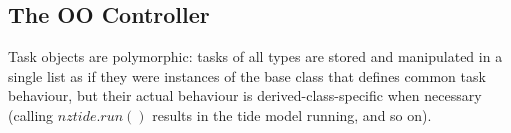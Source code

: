 \documentclass[12pt]{amsart}
\begin{document}
\subsection{The OO Controller}

Task objects are polymorphic: tasks of all types are stored and
manipulated in a single list as if they were instances of the base class
that defines common task behaviour, but their actual behaviour is
derived-class-specific when necessary (calling $nztide.run()$ results in
the tide model running, and so on). 
\end{document}
